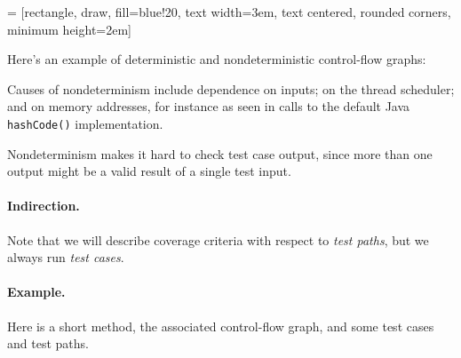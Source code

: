 \documentclass[11pt]{article}
\begin{document}
 = [rectangle, draw, fill=blue!20, 
    text width=3em, text centered, rounded corners, minimum height=2em]

Here's an example of deterministic and nondeterministic control-flow graphs:
\begin{center}
\end{center}
Causes of nondeterminism include dependence on inputs; on the thread
scheduler; and on memory addresses, for instance as seen in calls to 
the default Java {\tt hashCode()} implementation. 

Nondeterminism makes it hard to check test case output, since more
than one output might be a valid result of a single test input.

\paragraph{Indirection.} Note that we will describe coverage criteria
with respect to \emph{test paths}, but we always run \emph{test cases}.

\newpage
\paragraph{Example.} Here is a short method, the associated control-flow
graph, and some test cases and test paths.
\end{document}
